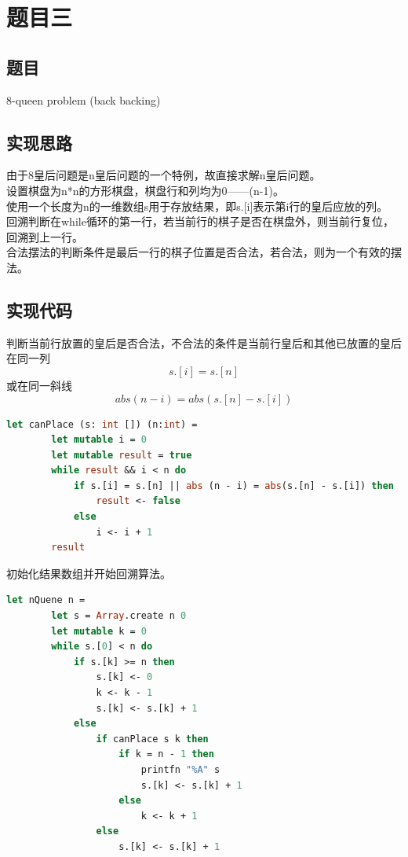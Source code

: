 \documentclass[a4paper]{article}
\begin{document}
\section{题目三}

\subsection{题目}

8-queen problem (back backing)

\subsection{实现思路}

由于8皇后问题是n皇后问题的一个特例，故直接求解n皇后问题。\\
设置棋盘为n*n的方形棋盘，棋盘行和列均为0——(n-1)。\\
使用一个长度为n的一维数组s用于存放结果，即s.[i]表示第i行的皇后应放的列。\\
回溯判断在while循环的第一行，若当前行的棋子是否在棋盘外，则当前行复位，回溯到上一行。\\
合法摆法的判断条件是最后一行的棋子位置是否合法，若合法，则为一个有效的摆法。
\subsection{实现代码}

判断当前行放置的皇后是否合法，不合法的条件是当前行皇后和其他已放置的皇后在同一列 \[s.[i] = s.[n]\] 或在同一斜线 \[abs (n - i) = abs(s.[n] - s.[i])\]

\begin{lstlisting}[language=ML]
    let canPlace (s: int []) (n:int) =
        let mutable i = 0
        let mutable result = true
        while result && i < n do
            if s.[i] = s.[n] || abs (n - i) = abs(s.[n] - s.[i]) then
                result <- false
            else
                i <- i + 1
        result
\end{lstlisting}

初始化结果数组并开始回溯算法。

\begin{lstlisting}[language=ML]
    let nQuene n =
        let s = Array.create n 0
        let mutable k = 0
        while s.[0] < n do
            if s.[k] >= n then
                s.[k] <- 0
                k <- k - 1
                s.[k] <- s.[k] + 1
            else
                if canPlace s k then
                    if k = n - 1 then
                        printfn "%A" s
                        s.[k] <- s.[k] + 1
                    else 
                        k <- k + 1
                else
                    s.[k] <- s.[k] + 1
\end{lstlisting}
\end{document}
